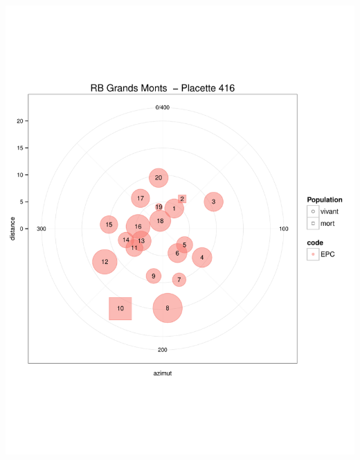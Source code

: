 \documentclass[a4paper]{book}\usepackage[]{graphicx}\usepackage[]{color}
\makeatletter
\def\maxwidth{ %
  \ifdim\Gin@nat@width>\linewidth
    \linewidth
  \else
    \Gin@nat@width
  \fi
}
\newenvironment{knitrout}{}{} %
\makeatother
\begin{document}
\begin{knitrout}
{\centering \includegraphics[width=\maxwidth]{Figures/PlanArbres-36} 

}





\end{knitrout}
\end{document}
